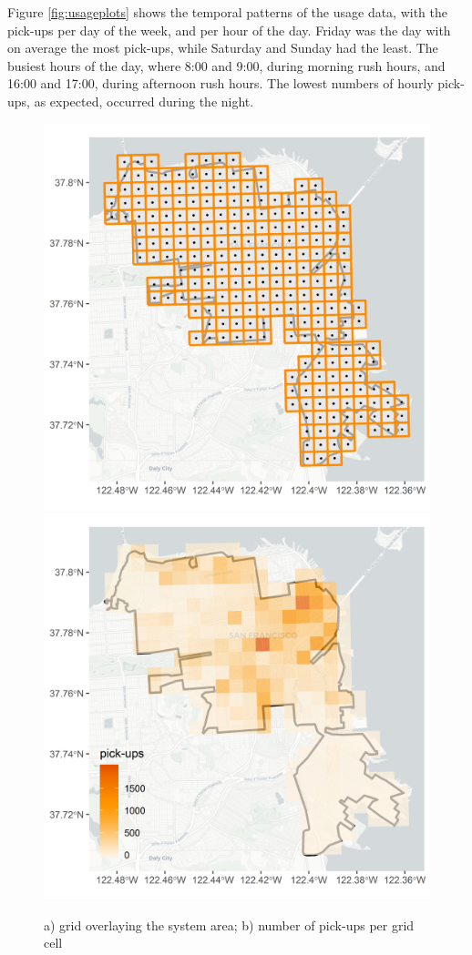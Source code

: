 \documentclass[12pt,oneside]{reedthesis}
\begin{document}
Figure \ref{fig:usageplots} shows the temporal patterns of the usage
data, with the pick-ups per day of the week, and per hour of the day.
Friday was the day with on average the most pick-ups, while Saturday and
Sunday had the least. The busiest hours of the day, where 8:00 and 9:00,
during morning rush hours, and 16:00 and 17:00, during afternoon rush
hours. The lowest numbers of hourly pick-ups, as expected, occurred
during the night.
\begin{figure}[H]
\includegraphics[width=0.5\linewidth]{Figures/grid} \includegraphics[width=0.5\linewidth]{Figures/pickups} \caption{a) grid overlaying the system area; b) number of pick-ups per grid cell}\label{fig:mapandgrid}
\end{figure}\begin{figure}[H]

\end{figure}
\end{document}
